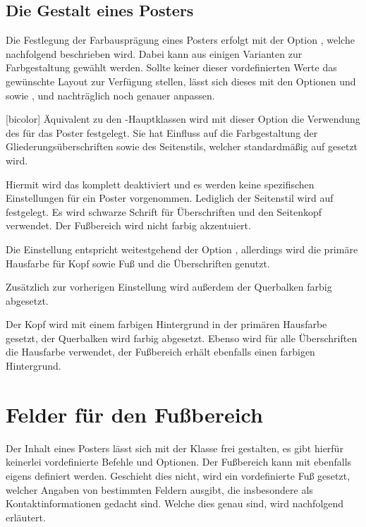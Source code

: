 \begin{Bundle*}[v2.05]{}
\subsection{Die Gestalt eines Posters}

Die Festlegung der Farbausprägung eines Posters erfolgt mit der Option 
, welche nachfolgend beschrieben wird. Dabei kann aus einigen 
Varianten zur Farbgestaltung gewählt werden. Sollte keiner dieser 
vordefinierten Werte das gewünschte Layout zur Verfügung stellen, lässt sich 
dieses mit den Optionen  und  sowie 
,  und  nachträglich 
noch genauer anpassen.


\begin{Declaration}{}[bicolor]
\printdeclarationlist%
%
Äquivalent zu den \TUDScript-Hauptklassen wird mit dieser Option die Verwendung 
des \TUDCDs für das Poster festgelegt. Sie hat Einfluss auf die Farbgestaltung 
der Gliederungsüberschriften sowie des Seitenstils, welcher standardmäßig auf 
 gesetzt wird.
%
\begin{values}{}
\itemfalse
  Hiermit wird das \CD komplett deaktiviert und es werden keine spezifischen 
  Einstellungen für ein Poster vorgenommen. Lediglich der Seitenstil wird auf 
   festgelegt.
  Es wird schwarze Schrift für Überschriften und den Seitenkopf verwendet. Der 
  Fußbereich wird nicht farbig akzentuiert.
\item[lightcolor/pale]
  Die Einstellung entspricht weitestgehend der Option , 
  allerdings wird die primäre Hausfarbe  für Kopf sowie Fuß und 
  die Überschriften genutzt.
\item[barcolor]
  Zusätzlich zur vorherigen Einstellung wird außerdem der Querbalken farbig 
  abgesetzt.
\item[bicolor/color/fullcolor]
  Der Kopf wird mit einem farbigen Hintergrund in der primären Hausfarbe 
   gesetzt, der Querbalken wird farbig abgesetzt. Ebenso wird für 
  alle Überschriften die Hausfarbe verwendet, der Fußbereich erhält ebenfalls 
  einen farbigen Hintergrund.
\end{values}
\end{Declaration}






\section{Felder für den Fußbereich}
%
%
Der Inhalt eines Posters lässt sich mit der Klasse  frei 
gestalten, es gibt hierfür keinerlei vordefinierte Befehle und Optionen. Der 
Fußbereich kann mit  ebenfalls eigens definiert werden. 
Geschieht dies nicht, wird ein vordefinierte Fuß gesetzt, welcher Angaben von 
bestimmten Feldern ausgibt, die insbesondere als Kontaktinformationen gedacht 
sind. Welche dies genau sind, wird nachfolgend erläutert.


\end{Bundle*}

